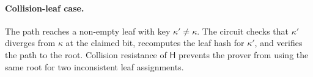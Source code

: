 \documentclass[runningheads]{llncs}
\newcommand{\CRH}{\mathsf{H}}
\begin{document}
\paragraph{Collision-leaf case.}
The path reaches a non-empty leaf with key \(\kappa'\ne\kappa\).  The circuit checks that \(\kappa'\) diverges from \(\kappa\) at the claimed bit, recomputes the leaf hash for \(\kappa'\), and verifies the path to the root.  Collision resistance of \(\CRH\) prevents the prover from using the same root for two inconsistent leaf assignments.
\end{document}
